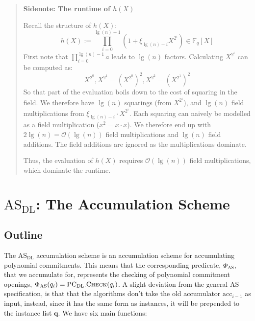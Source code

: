 \documentclass[
]{article}
\newcommand*\Fb{\mathbb{F}}
\newcommand*\Oc{\mathcal{O}}
\renewcommand{\vec}[1]{ \boldsymbol{#1} }
\newcommand*{\acc}{\mathrm{acc}}
\newcommand*{\AS}{\text{AS}}
\newcommand*{\PCDL}{\text{PC}_{\text{DL}}}
\newcommand*{\PCDLCheck}{\PCDL.\mathrm{\text{C\scriptsize HECK}}}
\newcommand*{\ASDL}{\text{AS}_{\text{DL}}}
\begin{document}
\begin{quote}
\color{GbGrey}

\textbf{Sidenote: The runtime of $h(X)$}

Recall the structure of $h(X)$:
$$h(X) := \prod^{\lg(n)-1}_{i=0} (1 + \xi_{\lg(n) - i} X^{2^i}) \in \Fb_q[X]$$
First note that $\prod^{\lg(n)-1}_{i=0} a$ leads to $\lg(n)$
factors. Calculating $X^{2^i}$ can be computed as:
$$X^{2^0}, X^{2^1} = (X^{2^0})^2, X^{2^2} = (X^{2^1})^2$$
So that part of the evaluation boils down to the cost of squaring in the
field. We therefore have $\lg(n)$ squarings (from $X^{2^i}$), and $\lg(n)$
field multiplications from $\xi_{\lg(n) - i} \cdot X^{2^i}$. Each squaring
can naively be modelled as a field multiplication ($x^2 = x \cdot x$). We
therefore end up with $2\lg(n) = \Oc(\lg(n))$ field multiplications
and $\lg(n)$ field additions. The field additions are ignored as the
multiplications dominate.

Thus, the evaluation of $h(X)$ requires $\Oc(\lg(n))$ field multiplications,
which dominate the runtime.

\end{quote}

\section{\texorpdfstring{\(\ASDL\): The Accumulation
Scheme}{\textbackslash ASDL: The Accumulation Scheme}}\label{asdl-the-accumulation-scheme}

\subsection{Outline}\label{outline-1}

The \(\ASDL\) accumulation scheme is an accumulation scheme for
accumulating polynomial commitments. This means that the corresponding
predicate, \(\Phi_\AS\), that we accumulate for, represents the checking
of polynomial commitment openings, \(\Phi_\AS(q_i) = \PCDLCheck(q_i)\).
A slight deviation from the general \(\AS\) specification, is that that
the algorithms don't take the old accumulator \(\acc_{i-1}\) as input,
instead, since it has the same form as instances, it will be prepended
to the instance list \(\vec{q}\). We have six main functions:
\end{document}
